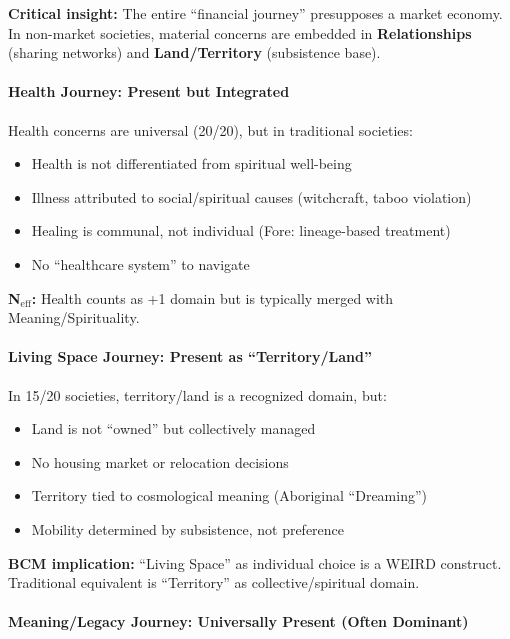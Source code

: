 \textbf{Critical insight:} The entire ``financial journey'' presupposes a market economy. In non-market societies, material concerns are embedded in \textbf{Relationships} (sharing networks) and \textbf{Land/Territory} (subsistence base).

\paragraph{Health Journey: Present but Integrated}

Health concerns are universal (20/20), but in traditional societies:
\begin{itemize}[nosep]
\item Health is not differentiated from spiritual well-being
\item Illness attributed to social/spiritual causes (witchcraft, taboo violation)
\item Healing is communal, not individual (Fore: lineage-based treatment)
\item No ``healthcare system'' to navigate
\end{itemize}

\textbf{N$_{\text{eff}}$:} Health counts as +1 domain but is typically merged with Meaning/Spirituality.

\paragraph{Living Space Journey: Present as ``Territory/Land''}

In 15/20 societies, territory/land is a recognized domain, but:
\begin{itemize}[nosep]
\item Land is not ``owned'' but collectively managed
\item No housing market or relocation decisions
\item Territory tied to cosmological meaning (Aboriginal ``Dreaming'')
\item Mobility determined by subsistence, not preference
\end{itemize}

\textbf{BCM implication:} ``Living Space'' as individual choice is a WEIRD construct. Traditional equivalent is ``Territory'' as collective/spiritual domain.

\paragraph{Meaning/Legacy Journey: Universally Present (Often Dominant)}

